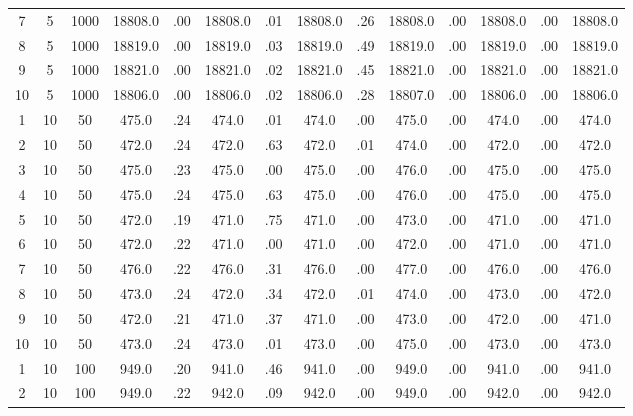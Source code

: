 \documentclass[12pt,a4paper]{article}
\begin{document}
\begin{center}
{\begin{tabular}{|ccc|cc|cc|cc|cc|cc|c|}
7             &   5&1000&  18808.0&  .00&  18808.0&  .01&  18808.0&  .26&  18808.0&  .00&  18808.0&  .00&  18808.0\\[-0.01in]
8             &   5&1000&  18819.0&  .00&  18819.0&  .03&  18819.0&  .49&  18819.0&  .00&  18819.0&  .00&  18819.0\\[-0.01in]
9             &   5&1000&  18821.0&  .00&  18821.0&  .02&  18821.0&  .45&  18821.0&  .00&  18821.0&  .00&  18821.0\\[-0.01in]
10            &   5&1000&  18806.0&  .00&  18806.0&  .02&  18806.0&  .28&  18807.0&  .00&  18806.0&  .00&  18806.0\\[-0.01in]
1             &  10&  50&    475.0&  .24&    474.0&  .01&    474.0&  .00&    475.0&  .00&    474.0&  .00&    474.0\\[-0.01in]
2             &  10&  50&    472.0&  .24&    472.0&  .63&    472.0&  .01&    474.0&  .00&    472.0&  .00&    472.0\\[-0.01in]
3             &  10&  50&    475.0&  .23&    475.0&  .00&    475.0&  .00&    476.0&  .00&    475.0&  .00&    475.0\\[-0.01in]
4             &  10&  50&    475.0&  .24&    475.0&  .63&    475.0&  .00&    476.0&  .00&    475.0&  .00&    475.0\\[-0.01in]
5             &  10&  50&    472.0&  .19&    471.0&  .75&    471.0&  .00&    473.0&  .00&    471.0&  .00&    471.0\\[-0.01in]
6             &  10&  50&    472.0&  .22&    471.0&  .00&    471.0&  .00&    472.0&  .00&    471.0&  .00&    471.0\\[-0.01in]
7             &  10&  50&    476.0&  .22&    476.0&  .31&    476.0&  .00&    477.0&  .00&    476.0&  .00&    476.0\\[-0.01in]
8             &  10&  50&    473.0&  .24&    472.0&  .34&    472.0&  .01&    474.0&  .00&    473.0&  .00&    472.0\\[-0.01in]
9             &  10&  50&    472.0&  .21&    471.0&  .37&    471.0&  .00&    473.0&  .00&    472.0&  .00&    471.0\\[-0.01in]
10            &  10&  50&    473.0&  .24&    473.0&  .01&    473.0&  .00&    475.0&  .00&    473.0&  .00&    473.0\\[-0.01in]
1             &  10& 100&    949.0&  .20&    941.0&  .46&    941.0&  .00&    949.0&  .00&    941.0&  .00&    941.0\\[-0.01in]
2             &  10& 100&    949.0&  .22&    942.0&  .09&    942.0&  .00&    949.0&  .00&    942.0&  .00&    942.0\\[-0.01in]

\end{tabular}}
\end{center}
\end{document}
